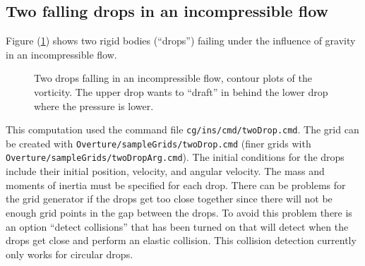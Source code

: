 \subsection{Two falling drops in an incompressible flow}\label{sec:fallingDrops}

Figure (\ref{fig:twoDrop}) shows two rigid bodies (``drops'') failing under the influence
of gravity in an incompressible flow. 
% 
{
\begin{figure}[H]
\newcommand{\figWidthd}{3cm}%
\newcommand{\trimfig}[2]{\trimPlot{#1}{#2}{.35}{.35}{.0}{.08}}
% 
\begin{center}%
\end{center}%
\caption{Two drops falling in an incompressible flow, contour plots of the vorticity. The upper drop wants to ``draft'' in behind the
lower drop where the pressure is lower.}
\label{fig:twoDrop}
\end{figure}
}

This computation used the command file {\tt cg/ins/cmd/twoDrop.cmd}. 
The grid can be created with
{\tt Overture/sampleGrids/twoDrop.cmd} (finer grids with {\tt Overture/sampleGrids/twoDropArg.cmd}). The initial conditions for
the drops include their initial position, velocity, and angular velocity. The
mass and moments of inertia must be specified for each drop. There can be problems
for the grid generator if the drops get too close together since there will not
be enough grid points in the gap between the drops. To avoid this problem 
there is an option ``detect collisions''
that has been turned on that will detect when the drops get close and perform an elastic
collision. This collision detection currently only works for circular drops. 